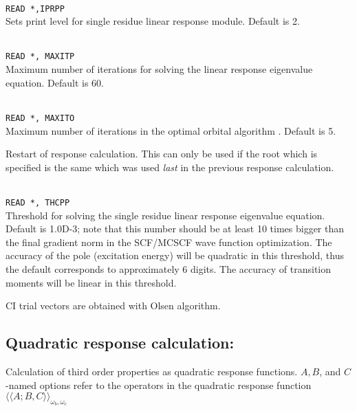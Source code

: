 \begin{description}
\item{}\\
\verb|READ *,IPRPP|\\
Sets print level for single residue linear response module. Default is 2.

\item{}\\
\verb|READ *, MAXITP|\\
Maximum number of iterations for solving the linear response eigenvalue
equation. Default is 60.

\item{}\\
\verb|READ *, MAXITO|\\
Maximum number of iterations in the optimal orbital
algorithm
\cite{tuhjahjajpjjcp84}. 
Default is 5.

\item{}
Restart of response
calculation. This can only be used if the root which is 
specified is the same which was used \textit{last} in the previous
response calculation.

\item{}\\
\verb|READ *, THCPP|\\
Threshold for solving the single residue linear response eigenvalue equation. 
Default is 1.0D-3; note that this number should be at least 10 times
bigger than the final gradient norm in the SCF/MCSCF
wave function optimization.
The accuracy of the pole (excitation energy) will be 
quadratic in this threshold, thus the default corresponds to approximately
6 digits. The accuracy of transition moments will be linear in this threshold.

\item{}
CI trial vectors are obtained with Olsen algorithm.

\end{description}

\subsection{Quadratic response calculation: }

Calculation of third order properties
 as quadratic response
functions.
$A,B$, and $C$-named options refer to the operators in the quadratic
response function 
$\langle\!\langle A;B,C \rangle\!\rangle_{\omega_b,\omega_c}$
\cite{ovhapjhjajthjojcp97,hhhjajpjjojcp97,haovhkpjthjcp98}


